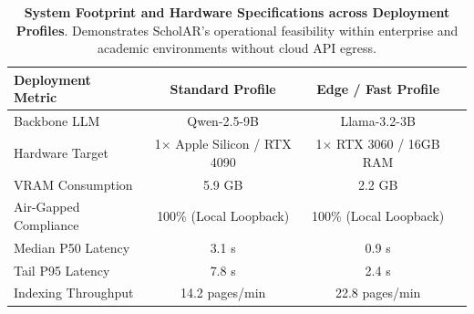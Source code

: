 \begin{table}[t]
\centering
\small
\begin{tabular}{lccc}
\toprule
\textbf{Deployment Metric} & \textbf{Standard Profile} & \textbf{Edge / Fast Profile} \\
\midrule
Backbone LLM & Qwen-2.5-9B & Llama-3.2-3B \\
Hardware Target & 1$\times$ Apple Silicon / RTX 4090 & 1$\times$ RTX 3060 / 16GB RAM \\
VRAM Consumption & 5.9 GB & 2.2 GB \\
Air-Gapped Compliance & 100\% (Local Loopback) & 100\% (Local Loopback) \\
Median P50 Latency & 3.1 s & 0.9 s \\
Tail P95 Latency & 7.8 s & 2.4 s \\
Indexing Throughput & 14.2 pages/min & 22.8 pages/min \\
\bottomrule
\end{tabular}
\caption{\textbf{System Footprint and Hardware Specifications across Deployment Profiles}. Demonstrates ScholAR's operational feasibility within enterprise and academic environments without cloud API egress.}
\label{tab:deployment_specs}
\end{table}
